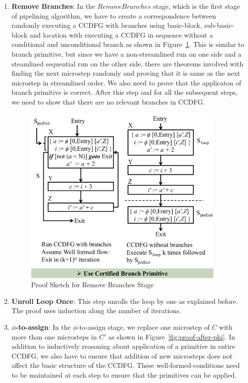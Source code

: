 \begin{enumerate}
\item \textbf{Remove Branches}: In the $Remove Branches$ stage, which is the first stage of pipelining algorithm, we have to create a correspondence between randomly executing a CCDFG with branches using basic-block, sub-basic-block and location with executing a CCDFG in sequence without a conditional and unconditional branch as shown in Figure~\ref{fig:proof-remove-branches}. This is similar to branch primitive, but since we have a non-streamlined run on one side and a steamlined sequential run on the other side, there are theorems involved with finding the next microstep randomly and proving that it is same as the next microstep in streamlined order. We also need to prove that the applicaton of branch primitive is correct. After this step and for all the subsequent steps, we need to show that there are no relevant branches in CCDFG.
                                             
\begin{figure}[t!]
\begin{center}
\includegraphics[height=3.5in]{fig-proposal/proof-remove-branches}
\end{center}
\caption{Proof Sketch for Remove Branches Stage}
\label{fig:proof-remove-branches}
\end{figure}

\item \textbf{Unroll Loop Once}: This step unrolls the loop by one as explained before. The proof uses induction along the number of iterations.

\item \textbf{$\phi$-to-assign}: In the $\phi$-to-assign stage, we replace one microstep of $C$ with more than one microsteps in $C'$
as shown in Figure~\ref{fig:proof-after-phi}. 
In addition to inductively reasoning about application of a primitive in entire CCDFG, we also have to ensure
that addition of new microsteps does not affect the basic structure of the CCDFG. These well-formed-conditions need to be maintained at each step to ensure that the primitives can be applied.




\end{enumerate}
